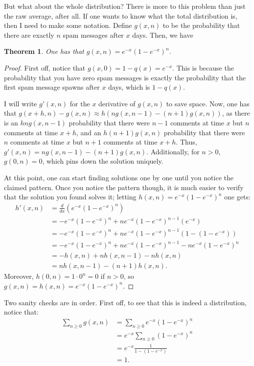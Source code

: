 \documentclass[11pt]{article}
\newtheorem{theorem}{Theorem}
\theoremstyle{definition}
\begin{document}
But what about the whole distribution?  There is more to this problem than just the raw average, after all.  If one wants to know what the total distribution is, then I need to make some notation.  Define $g(x, n)$ to be the probability that there are exactly $n$ spam messages after $x$ days.  Then, we have
\begin{theorem}
One has that $g(x, n) = e^{-x}(1-e^{-x})^n$.
\end{theorem}
\begin{proof}
First off, notice that $g(x, 0) = 1-q(x) = e^{-x}$.  This is because the probability that you have zero spam messages is exactly the probability that the first spam message spawns after $x$ days, which is $1-q(x)$.

I will write $g'(x, n)$ for the $x$ derivative of $g(x, n)$ to save space.  Now, one has that $g(x + h, n) - g(x, n) \approx h(ng(x, n-1) - (n+1)g(x, n))$, as there is an $hng(x, n-1)$ probability that there were $n-1$ comments at time $x$ but $n$ comments at time $x+h$, and an $h(n+1)g(x, n)$ probability that there were $n$ comments at time $x$ but $n+1$ comments at time $x+h$.  Thus, $g'(x, n) = ng(x, n-1) - (n+1)g(x, n)$.  Additionally, for $n > 0$, $g(0, n) = 0$, which pins down the solution uniquely.

At this point, one can start finding solutions one by one until you notice the claimed pattern.  Once you notice the pattern though, it is much easier to verify that the solution you found solves it; letting $h(x, n) = e^{-x}(1-e^{-x})^n$ one gets:
\begin{align*}
h'(x, n) & = \frac{d}{dx}\left(e^{-x}(1-e^{-x})^n\right) \\
& = -e^{-x}(1-e^{-x})^n + n e^{-x}(1-e^{-x})^{n-1}(e^{-x}) \\
& = -e^{-x}(1-e^{-x})^n + n e^{-x}(1-e^{-x})^{n-1}(1-(1-e^{-x})) \\
& = -e^{-x}(1-e^{-x})^n + n e^{-x}(1-e^{-x})^{n-1} - ne^{-x}(1-e^{-x})^n \\
& = -h(x, n) + n h(x, n-1) - n h(x, n) \\
& = n h(x, n-1) - (n+1) h(x, n).
\end{align*}
Moreover, $h(0, n) = 1\cdot 0^n = 0$ if $n > 0$, so $g(x, n) = h(x, n) = e^{-x}(1-e^{-x})^n$.
\end{proof}
Two sanity checks are in order.  First off, to see that this is indeed a distribution, notice that:
\begin{align*}
\sum_{n \geq 0}g(x, n) & = \sum_{n\geq 0} e^{-x}(1-e^{-x})^n \\
& = e^{-x} \sum_{n\geq 0}(1-e^{-x})^n \\
& = e^{-x}\frac{1}{1-(1-e^{-x})} \\
& = 1.
\end{align*}
\end{document}
